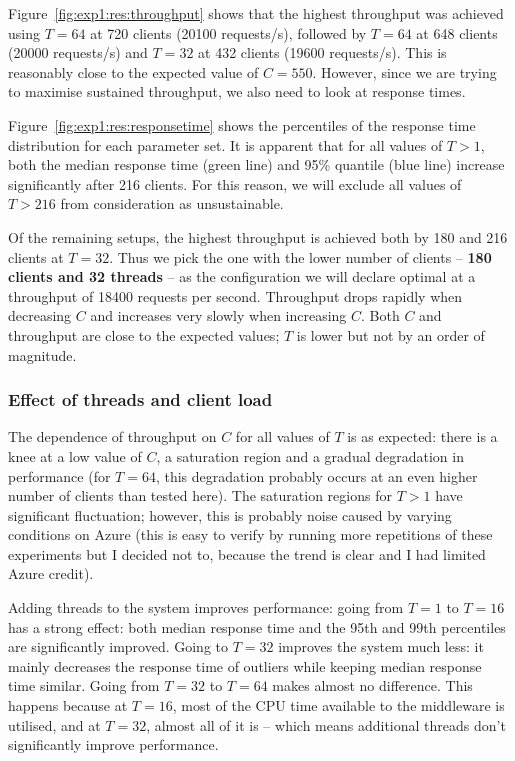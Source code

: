\documentclass[11pt]{article}
\begin{document}
Figure~\ref{fig:exp1:res:throughput} shows that the highest throughput was achieved using $T=64$ at 720 clients (20100 requests/s), followed by $T=64$ at 648 clients (20000 requests/s) and $T=32$ at 432 clients (19600 requests/s). This is reasonably close to the expected value of $C=550$. However, since we are trying to maximise sustained throughput, we also need to look at response times.

Figure~\ref{fig:exp1:res:responsetime} shows the percentiles of the response time distribution for each parameter set. It is apparent that for all values of $T > 1$, both the median response time (green line) and 95\% quantile (blue line) increase significantly after 216 clients. For this reason, we will exclude all values of $T > 216$ from consideration as unsustainable.

Of the remaining setups, the highest throughput is achieved both by 180 and 216 clients at $T=32$. Thus we pick the one with the lower number of clients -- \textbf{180 clients and 32 threads} -- as the configuration we will declare optimal at a throughput of 18400 requests per second. Throughput drops rapidly when decreasing $C$ and increases very slowly when increasing $C$. Both $C$ and throughput are close to the expected values; $T$ is lower but not by an order of magnitude.

\subsubsection{Effect of threads and client load}

The dependence of throughput on $C$ for all values of $T$ is as expected: there is a knee at a low value of $C$, a saturation region and a gradual degradation in performance (for $T=64$, this degradation probably occurs at an even higher number of clients than tested here). The saturation regions for $T>1$ have significant fluctuation; however, this is probably noise caused by varying conditions on Azure (this is easy to verify by running more repetitions of these experiments but I decided not to, because the trend is clear and I had limited Azure credit).

Adding threads to the system improves performance: going from $T=1$ to $T=16$ has a strong effect: both median response time and the 95th and 99th percentiles are significantly improved. Going to $T=32$ improves the system much less: it mainly decreases the response time of outliers while keeping median response time similar. Going from $T=32$ to $T=64$ makes almost no difference. This happens because at $T=16$, most of the CPU time available to the middleware is utilised, and at $T=32$, almost all of it is -- which means additional threads don't significantly improve performance.
\end{document}
